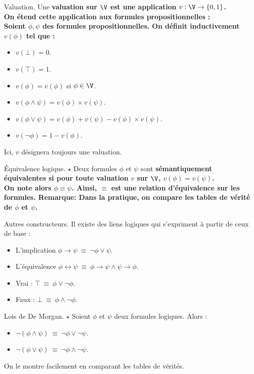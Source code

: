 \documentclass[french, 11pt]{article}
\begin{document}
\begin{defi}{Valuation.}{}
    Une \bf{valuation} sur $\V$ est une application $v:\V\to\{0,1\}$.\\
    On étend cette application aux formules propositionnelles :\\
    Soient $\phi,\psi$ des formules propositionnelles. On définit inductivement $v(\phi)$ tel que :
    \begin{itemize}[topsep=0pt,itemsep=-0.9 ex]
        \item $v(\bot)=0$.
        \item $v(\top)=1$.
        \item $v(\phi)=v(\phi)$ si $\phi\in\V$.
        \item $v(\phi\land\psi)=v(\phi)\times v(\psi)$.
        \item $v(\phi\lor\psi)=v(\phi) + v(\psi) - v(\phi)\times v(\psi)$.
        \item $v(\lnot\phi)=1-v(\phi)$.
    \end{itemize}
    Ici, $v$ désignera toujours une valuation.
\end{defi}

\begin{defi}{Équivalence logique. $\star$}{}
    Deux formules $\phi$ et $\psi$ sont \bf{sémantiquement équivalentes} si pour toute valuation $v$ sur $\V$, $v(\phi)=v(\psi)$.\\
    On note alors $\phi\equiv\psi$. Ainsi, $\equiv$ est une relation d'équivalence sur les formules.\n
    \bf{Remarque:} Dans la pratique, on compare les tables de vérité de $\phi$ et $\psi$.
\end{defi}

\begin{defi}{Autres constructeurs.}{}
    Il existe des liens logiques qui s'expriment à partir de ceux de base :
    \begin{itemize}[topsep=0pt,itemsep=-0.9 ex]
        \item L'implication $\phi \rightarrow \psi ~ \equiv ~ \lnot\phi\lor\psi$.
        \item L'équivalence $\phi \leftrightarrow \psi ~ \equiv ~ \phi\rightarrow\psi\land\psi\rightarrow\phi$.
        \item Vrai : $\top ~ \equiv ~ \phi\lor\lnot\phi$.
        \item Faux : $\bot ~ \equiv ~ \phi\land\lnot\phi$.
    \end{itemize}
\end{defi}

\begin{prop}{Lois de De Morgan. $\star$}{}
    Soient $\phi$ et $\psi$ deux formules logiques. Alors :
    \begin{itemize}[topsep=0pt,itemsep=-0.9 ex]
        \item $\lnot(\phi\land\psi) ~ \equiv ~ \lnot\phi\lor\lnot\psi$.
        \item $\lnot(\phi\lor\psi) ~ \equiv ~ \lnot\phi\land\lnot\psi$.
    \end{itemize}
    \tcblower
    On le montre facilement en comparant les tables de vérités.
\end{prop}
\end{document}
